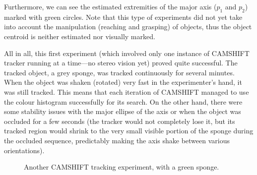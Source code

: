 Furthermore, we can see the estimated extremities of the major axis ($p_1$ and $p_2$) marked with green circles. Note that this type of experiments did not yet take into account the manipulation (reaching and grasping) of objects, thus the object centroid is neither estimated nor visually marked.

All in all, this first experiment (which involved only one instance of \ac{CAMSHIFT} tracker running at a time---no stereo vision yet) proved quite successful. The tracked object, a grey sponge, was tracked continuously for several minutes. When the object was shaken (rotated) very fast in the experimenter's hand, it was still tracked. This means that each iteration of \ac{CAMSHIFT} managed to use the colour histogram successfully for its search. On the other hand, there were some stability issues with the major ellipse of the axis or when the object was occluded for a few seconds (the tracker would not completely lose it, but its tracked region would shrink to the very small visible portion of the sponge during the occluded sequence, predictably making the axis shake between various orientations).



\begin{figure}
\centering
{} \quad
%
\caption[Second \acs{CAMSHIFT} tracking experiment]{Another \ac{CAMSHIFT} tracking experiment, with a green sponge.}
\label{img:1225camshift_exp}
\end{figure}

